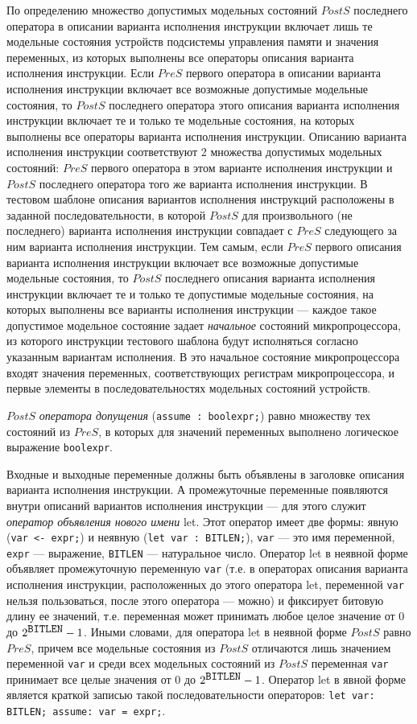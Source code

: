 По определению множество допустимых модельных состояний $PostS$ последнего оператора в описании варианта исполнения инструкции включает лишь те модельные состояния устройств подсистемы управления памяти и значения переменных, из которых выполнены все операторы описания варианта исполнения инструкции. Если $PreS$ первого оператора в описании варианта исполнения инструкции включает все возможные допустимые модельные состояния, то $PostS$ последнего оператора этого описания варианта исполнения инструкции включает те и только те модельные состояния, на которых выполнены все операторы варианта исполнения инструкции. Описанию варианта исполнения инструкции соответствуют 2 множества допустимых модельных состояний: $PreS$ первого оператора в этом варианте исполнения инструкции и $PostS$ последнего оператора того же варианта исполнения инструкции. В тестовом шаблоне описания вариантов исполнения инструкций расположены в заданной последовательности, в которой $PostS$ для произвольного (не последнего) варианта исполнения инструкции совпадает с $PreS$ следующего за ним варианта исполнения инструкции. Тем самым, если $PreS$ первого описания варианта исполнения инструкции включает все возможные допустимые модельные состояния, то $PostS$ последнего описания варианта исполнения инструкции включает те и только те допустимые модельные состояния, на которых выполнены все варианты исполнения инструкции --- каждое такое допустимое модельное состояние задает \emph{начальное} состояний микропроцессора, из которого инструкции тестового шаблона будут исполняться согласно указанным вариантам исполнения. В это начальное состояние микропроцессора входят значения переменных, соответствующих регистрам микропроцессора, и первые элементы в последовательностях модельных состояний устройств.

$PostS$ \emph{оператора допущения} (\texttt{assume : boolexpr;}) равно множеству тех состояний из $PreS$, в которых для значений переменных выполнено логическое выражение \texttt{boolexpr}.

Входные и выходные переменные должны быть объявлены в заголовке описания варианта исполнения инструкции. А промежуточные переменные появляются внутри описаний вариантов исполнения инструкции --- для этого служит \emph{оператор объявления нового имени} let. Этот оператор имеет две формы: явную (\texttt{var <- expr;}) и неявную (\texttt{let var : BITLEN;}), \texttt{var} --- это имя переменной, \texttt{expr} --- выражение, \texttt{BITLEN} --- натуральное число. Оператор let в неявной форме объявляет промежуточную переменную \texttt{var} (т.е. в операторах описания варианта исполнения инструкции, расположенных до этого оператора let, переменной \texttt{var} нельзя пользоваться, после этого оператора --- можно) и фиксирует битовую длину ее значений, т.е. переменная может принимать любое целое значение от 0 до $2^{\mbox{\texttt{BITLEN}}}-1$. Иными словами, для оператора let в неявной форме $PostS$ равно $PreS$, причем все модельные состояния из $PostS$ отличаются лишь значением переменной \texttt{var} и среди всех модельных состояний из $PostS$ переменная \texttt{var} принимает все целые значения от 0 до $2^{\mbox{\texttt{BITLEN}}}-1$. Оператор let в явной форме является краткой записью такой последовательности операторов: \texttt{let var: BITLEN; assume: var = expr;}.

